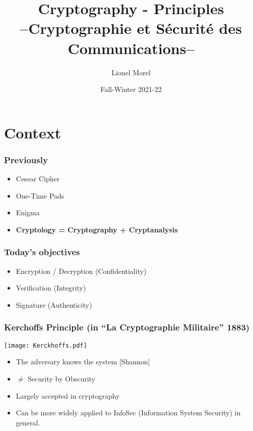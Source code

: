 \documentclass[
hyperref={pdfpagelabels=false}
,xcolor=table
]
{beamer}
\title[CSC - Intro]{Cryptography - Principles \\ --Cryptographie et Sécurité des Communications--}
\author[]{Lionel Morel}
\institute[]{Telecommunications - INSA Lyon}
\date{Fall-Winter 2021-22}
\begin{document}
\begin{frame}
  \maketitle
\end{frame}

\section{Context}

\begin{frame}
  \frametitle{Previously}
  \begin{itemize}
  \item Cesear Cipher
  \item One-Time Pads 
  \item Enigma
  \item \textbf{Cryptology = Cryptography + Cryptanalysis}
  \end{itemize}
\end{frame}


\begin{frame}
  \frametitle{Today's objectives}
  \begin{itemize}
  \item Encryption / Decryption (Confidentiality)
  \item Verification (Integrity)
  \item Signature (Authenticity)
  \end{itemize}
\end{frame}


\begin{frame}
  \frametitle{Kerchoffs Principle {\normalsize (in ``La Cryptographie Militaire'' 1883)}}
  \begin{center}
    \texttt{[image: Kerckhoffs.pdf]}
  \end{center}
  
  \begin{itemize}
  \item The adversary knows the system [Shannon]
  \item $\ne$ Security by Obscurity
  \item Largely accepted in cryptography
  \item Can be more widely applied to InfoSec (Information System Security) in general. 
  \end{itemize}
\end{frame}
\end{document}

